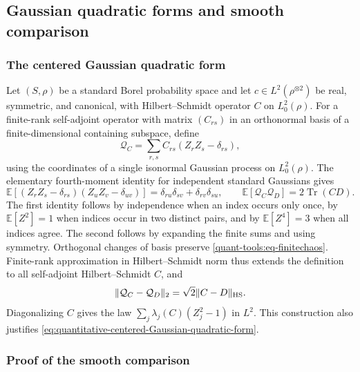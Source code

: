 \documentclass[11pt,reqno]{amsart}
\numberwithin{equation}{section}
\theoremstyle{plain}
\theoremstyle{remark}
\DeclarePairedDelimiter{\norm}{\lVert}{\rVert}
\newcommand{\E}{{\mathbb{E}}}
\DeclareMathOperator{\Tr}{Tr}
\begin{document}
\subsection{Gaussian quadratic forms and smooth comparison}
\label{quant-tools:sec-gaussian}

\subsubsection{The centered Gaussian quadratic form}
\label{quant-tools:subsec-chaos-construction}

Let $(S,\rho)$ be a standard Borel probability space and let $c\in L^2(\rho^{\otimes2})$ be real, symmetric, and canonical, with Hilbert--Schmidt operator $C$ on $L^2_0(\rho)$. For a finite-rank self-adjoint operator with matrix $(C_{rs})$ in an orthonormal basis of a finite-dimensional containing subspace, define
\begin{equation}\label{quant-tools:eq-finitechaos}
 \mathcal Q_C=\sum_{r,s}C_{rs}(Z_rZ_s-\delta_{rs}),
\end{equation}
using the coordinates of a single isonormal Gaussian process on $L^2_0(\rho)$. The elementary fourth-moment identity for independent standard Gaussians gives
\begin{equation}\label{quant-tools:eq-chaosisometry}
 \E[(Z_rZ_s-\delta_{rs})(Z_uZ_v-\delta_{uv})]
 =\delta_{ru}\delta_{sv}+\delta_{rv}\delta_{su},
 \qquad \E[\mathcal Q_C\mathcal Q_D]=2\Tr(CD).
\end{equation}
The first identity follows by independence when an index occurs only once, by $\E[Z^2]=1$ when indices occur in two distinct pairs, and by $\E[Z^4]=3$ when all indices agree. The second follows by expanding the finite sums and using symmetry. Orthogonal changes of basis preserve \eqref{quant-tools:eq-finitechaos}. Finite-rank approximation in Hilbert--Schmidt norm thus extends the definition to all self-adjoint Hilbert--Schmidt $C$, and
\begin{equation}\label{quant-tools:eq-chaoscontinuity}
 \norm{\mathcal Q_C-\mathcal Q_D}_2=\sqrt2\norm{C-D}_{\mathrm{HS}}.
\end{equation}
Diagonalizing $C$ gives the law $\sum_j\lambda_j(C)(Z_j^2-1)$ in $L^2$. This construction also justifies \eqref{eq:quantitative-centered-Gaussian-quadratic-form}.
\subsubsection{Proof of the smooth comparison}
\label{quant-tools:subsec-smooth-proof}
\end{document}
